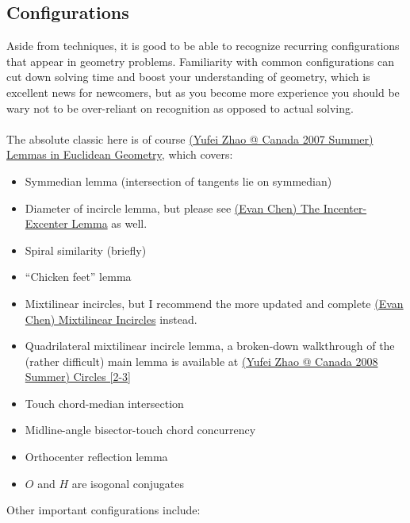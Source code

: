 	\subsection{Configurations}
	Aside from techniques, it is good to be able to recognize recurring configurations that appear in geometry problems. Familiarity with common configurations can cut down solving time and boost your understanding of geometry, which is excellent news for newcomers, but as you become more experience you should be wary not to be over-reliant on recognition as opposed to actual solving.\\\\
	The absolute classic here is of course \href{run:./F_geometry/(Yufei Zhao @ Canada 2007 Summer) Lemmas in Euclidean Geometry.pdf}{(Yufei Zhao @ Canada 2007 Summer) Lemmas in Euclidean Geometry}, which covers:
	\begin{itemize}
	\item Symmedian lemma (intersection of tangents lie on symmedian)
	\item Diameter of incircle lemma, but please see \href{run:./F_geometry/(Evan Chen) The Incenter-Excenter Lemma.pdf}{(Evan Chen) The Incenter-Excenter Lemma} as well.
	\item Spiral similarity (briefly)
	\item ``Chicken feet'' lemma
	\item Mixtilinear incircles, but I recommend the more updated and complete \href{run:./F_geometry/(Evan Chen) Mixtilinear Incircles.pdf}{(Evan Chen) Mixtilinear Incircles} instead.
	\item Quadrilateral mixtilinear incircle lemma, a broken-down walkthrough of the (rather difficult) main lemma is available at \href{run:./F_geometry/(Yufei Zhao @ Canada 2008 Summer) Circles.pdf}{(Yufei Zhao @ Canada 2008 Summer) Circles [2-3]}
	\item Touch chord-median intersection
	\item Midline-angle bisector-touch chord concurrency
	\item Orthocenter reflection lemma
	\item $O$ and $H$ are isogonal conjugates
	\end{itemize}
	Other important configurations include:

